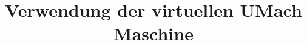 \documentclass[fontsize=12pt,parskip=full,index=totoc,listof=totoc,titlepage]
{scrartcl}
\title{Verwendung der virtuellen UMach Maschine}
\author{}
\begin{document}
\maketitle
\tableofcontents
\lstlistoflistings













\appendix
\printindex
\end{document}
